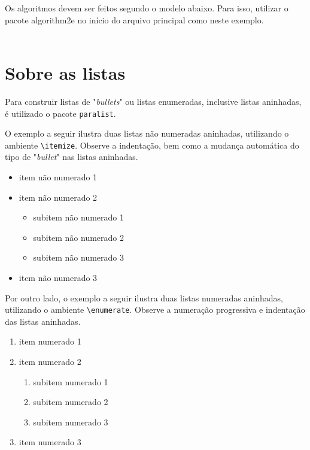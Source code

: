 \begin{apendicesenv}
Os algoritmos devem ser feitos segundo o modelo abaixo. Para isso, utilizar o
pacote {\ttfamily algorithm2e} no início do arquivo principal como neste
exemplo.
\\
\\




\chapter{Sobre as listas}
\label{chap:apSobreLista}

Para construir listas de "\textit{bullets}"{} ou listas enumeradas, inclusive
listas aninhadas, é utilizado o pacote \verb|paralist|.

O exemplo a seguir ilustra duas listas não numeradas aninhadas, utilizando o
ambiente \verb|\itemize|. Observe a indentação, bem como a mudança automática do
tipo de "\textit{bullet}"{} nas listas aninhadas.

\begin{itemize}
    \item item não numerado 1
    \item item não numerado 2
    \begin{itemize}
        \item subitem não numerado 1
        \item subitem não numerado 2
        \item subitem não numerado 3
    \end{itemize}
    \item item não numerado 3
\end{itemize}

Por outro lado, o exemplo a seguir ilustra duas listas numeradas aninhadas,
utilizando o ambiente \verb|\enumerate|. Observe a numeração progressiva e
indentação das listas aninhadas.

\begin{enumerate}
    \item item numerado 1
    \item item numerado 2
    \begin{enumerate}
        \item subitem numerado 1
        \item subitem numerado 2
        \item subitem numerado 3
    \end{enumerate}
    \item item numerado 3
\end{enumerate}


\end{apendicesenv}
